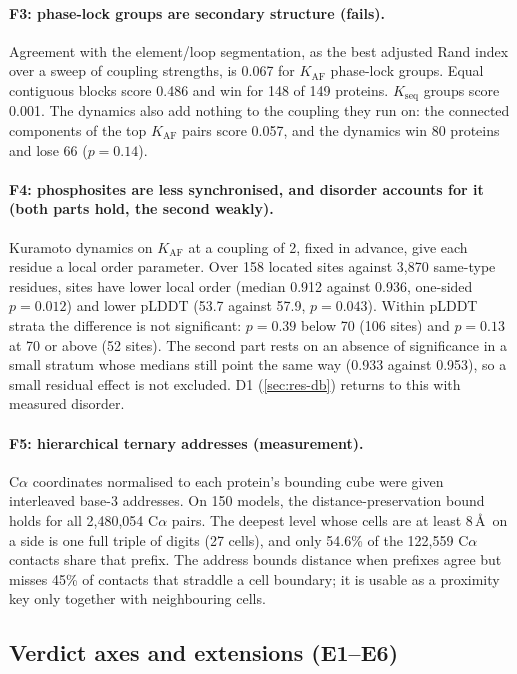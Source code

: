 \paragraph{F3: phase-lock groups are secondary structure (fails).}
Agreement with the element/loop segmentation, as the best adjusted Rand index over a sweep of coupling strengths, is 0.067 for $K_{\mathrm{AF}}$ phase-lock groups.
Equal contiguous blocks score 0.486 and win for 148 of 149 proteins.
$K_{\mathrm{seq}}$ groups score 0.001.
The dynamics also add nothing to the coupling they run on: the connected components of the top $K_{\mathrm{AF}}$ pairs score 0.057, and the dynamics win 80 proteins and lose 66 ($p=0.14$).

\paragraph{F4: phosphosites are less synchronised, and disorder accounts for it (both parts hold, the second weakly).}
Kuramoto dynamics on $K_{\mathrm{AF}}$ at a coupling of 2, fixed in advance, give each residue a local order parameter.
Over 158 located sites against 3{,}870 same-type residues, sites have lower local order (median 0.912 against 0.936, one-sided $p=0.012$) and lower pLDDT (53.7 against 57.9, $p=0.043$).
Within pLDDT strata the difference is not significant: $p=0.39$ below 70 (106 sites) and $p=0.13$ at 70 or above (52 sites).
The second part rests on an absence of significance in a small stratum whose medians still point the same way (0.933 against 0.953), so a small residual effect is not excluded.
D1 (\cref{sec:res-db}) returns to this with measured disorder.

\paragraph{F5: hierarchical ternary addresses (measurement).}
C$\alpha$ coordinates normalised to each protein's bounding cube were given interleaved base-3 addresses.
On 150 models, the distance-preservation bound holds for all 2{,}480{,}054 C$\alpha$ pairs.
The deepest level whose cells are at least 8\,\AA\ on a side is one full triple of digits (27 cells), and only 54.6\% of the 122{,}559 C$\alpha$ contacts share that prefix.
The address bounds distance when prefixes agree but misses 45\% of contacts that straddle a cell boundary; it is usable as a proximity key only together with neighbouring cells.

\subsection{Verdict axes and extensions (E1--E6)}
\label{sec:res-extend}

